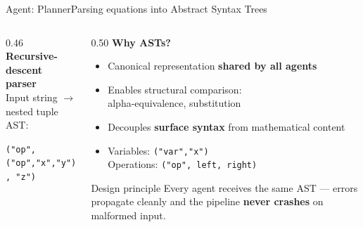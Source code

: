 \documentclass[aspectratio=169,10pt]{beamer}
\newcommand{\cy}[1]{\textcolor{AccentBlue}{\textbf{#1}}}
\begin{document}
\begin{frame}{Agent: Planner}{Parsing equations into Abstract Syntax Trees}
\begin{columns}[T,onlytextwidth]
  \begin{column}{0.46\textwidth}
    \vspace{4mm}
    \cy{Recursive-descent parser}\\[5pt]
    Input string $\to$ nested tuple AST:

    \vspace{6mm}
    \centering

    \vspace{4mm}
    \centering\texttt{\scriptsize ("op", ("op","x","y"), "z")}
  \end{column}
  \hfill
  \begin{column}{0.50\textwidth}
    \vspace{4mm}
    \cy{Why ASTs?}
    \vspace{3mm}
    \begin{itemize}\setlength\itemsep{6pt}
      \item Canonical representation \textbf{shared by all agents}
      \item Enables structural comparison:\\
            alpha-equivalence, substitution
      \item Decouples \textbf{surface syntax} from mathematical content
      \item Variables: \texttt{("var","x")}\\
            Operations: \texttt{("op", left, right)}
    \end{itemize}
    \vspace{6mm}
    \begin{block}{Design principle}
      Every agent receives the same AST —
      errors propagate cleanly and the pipeline
      \textbf{never crashes} on malformed input.
    \end{block}
  \end{column}
\end{columns}
\end{frame}
\end{document}
